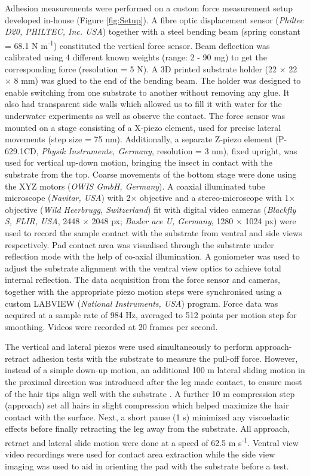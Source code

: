 \documentclass[vruler,JEB]{COB}%
\begin{document}
Adhesion measurements were performed on a custom force measurement
setup developed in-house (Figure \ref{fig:Setup}). A fibre optic
displacement sensor (\emph{Philtec D20, PHILTEC, Inc. USA}) together
with a steel bending beam (spring constant = 68.1 N m\protect\textsuperscript{-1}) constituted
the vertical force sensor. Beam deflection was calibrated using 4
different known weights (range: 2 - 90 mg) to get the corresponding force (resolution = 5 \textmu N). A
3D printed substrate holder (22 $\times$ 22 $\times$ 8 mm) was glued to the end of the bending beam.
The holder was designed to enable switching from one substrate to
another without removing any glue. It also had transparent side walls
which allowed us to fill it with water for the underwater experiments
as well as observe the contact. The force sensor was mounted on a stage
consisting of a X-piezo element, used for precise lateral movements (step size = 75 nm). Additionally, a separate Z-piezo element (P-629.1CD, \emph{Physik Instrumente, Germany}, resolution = 3 nm), fixed upright,
was used for vertical up-down motion, bringing the insect in contact
with the substrate from the top. Coarse movements of the bottom stage were done using the XYZ motors (\emph{OWIS GmbH, Germany}).
A coaxial illuminated tube microscope
(\emph{Navitar, USA}) with 2$\times$ objective and a stereo-microscope
with 1$\times$ objective (\emph{Wild Heerbrugg, Switzerland}) fit with digital video cameras 
(\emph{Blackfly S, FLIR, USA}, 2448 $\times$ 2048 px; \emph{Basler ace U, Germany}, 1280 $\times$ 1024 px)
were used to record the sample contact with the substrate from ventral
and side views respectively. Pad contact area was visualised through
the substrate under reflection mode with the help of co-axial illumination. A goniometer was used to adjust the substrate alignment
with the ventral view optics to achieve total internal reflection.
The data acquisition from the force sensor and cameras, together with
the appropriate piezo motion steps were synchronised using a custom
LABVIEW (\emph{National Instruments, USA}) program. Force data was acquired at a sample rate of 984 Hz,
averaged to 512 points per motion step for smoothing. Videos were recorded at 20
frames per second. 

The vertical and lateral piezos were used simultaneously to perform approach-retract
adhesion tests with the substrate to measure the pull-off force. However,
instead of a simple down-up motion, an additional 100 \textmu m lateral sliding motion in the proximal direction 
was introduced after the leg made contact, to ensure most of the hair tips align well with the substrate \citep{RN19}.
A further 10 \textmu m compression step (approach) set all hairs in slight compression which helped maximize the hair contact
with the surface. Next, a short pause (1 s) minimized any
viscoelastic effects before finally retracting the leg away from the
substrate. All approach, retract and lateral slide motion were done
at a speed of 62.5 \textmu m s\protect\textsuperscript{-1}. Ventral view video recordings
were used for contact area extraction while the side view imaging was used to aid in orienting the pad
with the substrate before a test.
\end{document}
